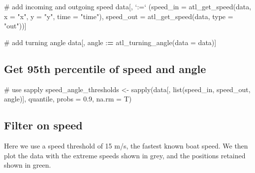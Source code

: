 \documentclass[]{scrreprt}
\newenvironment{Shaded}{}{}
\newcommand{\CommentTok}[1]{\textcolor[rgb]{0.00,0.50,0.00}{#1}}
\newcommand{\DataTypeTok}[1]{#1}
\newcommand{\ErrorTok}[1]{\textcolor[rgb]{1.00,0.00,0.00}{\textbf{#1}}}
\newcommand{\FloatTok}[1]{#1}
\newcommand{\KeywordTok}[1]{\textcolor[rgb]{0.00,0.00,1.00}{#1}}
\newcommand{\NormalTok}[1]{#1}
\newcommand{\OperatorTok}[1]{#1}
\newcommand{\StringTok}[1]{\textcolor[rgb]{0.00,0.50,0.50}{#1}}
\begin{document}
\begin{Shaded}
\begin{Highlighting}[]
\CommentTok{# add incoming and outgoing speed}
\NormalTok{data[, }\StringTok{`}\DataTypeTok{:=}\StringTok{`}\NormalTok{ (}\DataTypeTok{speed_in =} \KeywordTok{atl_get_speed}\NormalTok{(data, }
                                      \DataTypeTok{x =} \StringTok{"x"}\NormalTok{, }
                                      \DataTypeTok{y =} \StringTok{"y"}\NormalTok{, }
                                      \DataTypeTok{time =} \StringTok{"time"}\NormalTok{),}
             \DataTypeTok{speed_out =} \KeywordTok{atl_get_speed}\NormalTok{(data, }\DataTypeTok{type =} \StringTok{"out"}\NormalTok{))]}

\CommentTok{# add turning angle}
\NormalTok{data[, angle }\OperatorTok{:}\ErrorTok{=}\StringTok{ }\KeywordTok{atl_turning_angle}\NormalTok{(}\DataTypeTok{data =}\NormalTok{ data)]}
\end{Highlighting}
\end{Shaded}

\hypertarget{get-95th-percentile-of-speed-and-angle}{%
\subsection{Get 95th percentile of speed and angle}\label{get-95th-percentile-of-speed-and-angle}}

\begin{Shaded}
\begin{Highlighting}[]
\CommentTok{# use sapply}
\NormalTok{speed_angle_thresholds <-}\StringTok{ }
\StringTok{  }\KeywordTok{sapply}\NormalTok{(data[, }\KeywordTok{list}\NormalTok{(speed_in, speed_out, angle)], }
\NormalTok{       quantile, }\DataTypeTok{probs =} \FloatTok{0.9}\NormalTok{, }\DataTypeTok{na.rm =}\NormalTok{ T)}
\end{Highlighting}
\end{Shaded}

\hypertarget{filter-on-speed}{%
\subsection{Filter on speed}\label{filter-on-speed}}

Here we use a speed threshold of 15 m/s, the fastest known boat speed.
We then plot the data with the extreme speeds shown in grey, and the positions retained shown in green.
\end{document}
